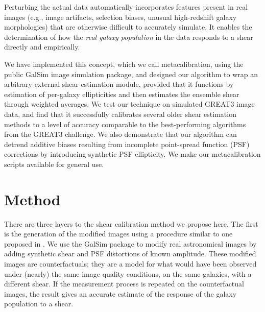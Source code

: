 \documentclass[iop]{emulateapj}
\newcommand\rmcomment[1]{\textcolor{red}{(RM: #1)}}
\begin{document}
 Perturbing the actual data automatically incorporates features
present in real images (e.g., image artifacts, selection biases,
unusual high-redshift galaxy morphologies) that are otherwise
difficult to accurately simulate.  It enables the determination of how the {\em real galaxy
  population} in the data responds to a shear directly and empirically.


We have implemented this concept, which we call metacalibration, using
the public GalSim \citep{2015A&C....10..121R} image simulation
package, and designed our algorithm to wrap an arbitrary external
shear estimation module, provided that it functions by estimation of per-galaxy ellipticities and
then estimates the ensemble shear through weighted averages. We test our technique on simulated GREAT3
image data, and find that it successfully calibrates several older shear
estimation methods to a level of accuracy comparable to the
best-performing algorithms from the GREAT3 challenge. We also
demonstrate that our algorithm can detrend additive biases resulting
from incomplete point-spread function (PSF) corrections by introducing synthetic PSF
ellipticity.  We make our metacalibration scripts available for
general use.

\section{Method}
There are three layers to the shear calibration method we propose
here. The first is the generation of the modified images using a procedure similar to one proposed
in \cite{2000ApJ...537..555K}.
We use the GalSim package \citep{2015A&C....10..121R} to modify real
astronomical images by adding synthetic shear and PSF distortions of
known amplitude. These modified images are counterfactuals; they are a
model for what would have been observed under (nearly) the same image
quality conditions, on the same galaxies, with a different shear. If
the measurement process is repeated on the counterfactual images, the
result gives an accurate estimate of the response of the galaxy population to a shear.
\end{document}
